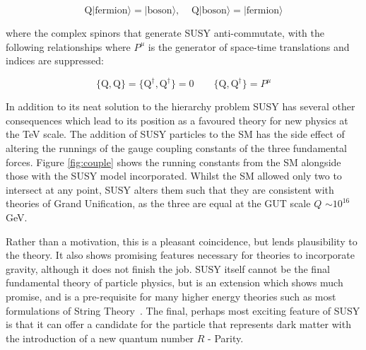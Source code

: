 \begin{equation}
\textrm{Q}|\textrm{fermion}\rangle = |\textrm{boson}\rangle,  \; \; \; \;  \textrm{Q}|\textrm{boson}\rangle = |\textrm{fermion}\rangle  
\label{eqn:Q}
\end{equation}

where the complex spinors that generate SUSY anti-commutate, with the following relationships where $P^{\mu}$ is the generator of space-time translations and indices are suppressed:


\begin{equation}
\{\textrm{Q},\textrm{Q}\} = \{\textrm{Q}^{\dagger},\textrm{Q}^{\dagger}\} = 0 \qquad \{\textrm{Q},\textrm{Q}^{\dagger}\} = P^{\mu} 
\end{equation} 


In addition to its neat solution to the hierarchy problem SUSY has several other consequences which lead to its position as a favoured theory for new physics at the TeV scale. The addition of SUSY particles to the SM has the side effect of altering the runnings of the gauge coupling constants of the three fundamental forces. Figure \ref{fig:couple} shows the running constants from the SM alongside those with the SUSY model incorporated. Whilst the SM allowed only two to intersect at any point, SUSY alters them such that they are consistent with theories of Grand Unification, as the three are equal at the GUT scale $Q$ $\sim 10^{16}$ GeV. 

Rather than a motivation, this is a pleasant coincidence, but lends plausibility to the theory. It also shows promising features necessary for theories to incorporate gravity, although it does not finish the job. SUSY itself cannot be the final fundamental theory of particle physics, but is an extension which shows much promise, and is a pre-requisite for many higher energy theories such as most formulations of String Theory~\cite{Dine}. The final, perhaps most exciting feature of SUSY is that it can offer a candidate for the particle that represents dark matter with the introduction of a new quantum number $R$ - Parity. 

